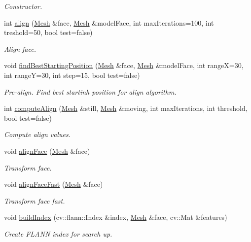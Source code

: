 \begin{DoxyCompactItemize}
\begin{DoxyCompactList}\small\item\em Constructor. \end{DoxyCompactList}\item 
int \hyperlink{class_face_aligner_af0bf1c512ec1c25be1600c175f29af3f}{align} (\hyperlink{class_mesh}{Mesh} \&face, \hyperlink{class_mesh}{Mesh} \&model\+Face, int max\+Iterations=100, int treshold=50, bool test=false)
\begin{DoxyCompactList}\small\item\em Align face. \end{DoxyCompactList}\item 
void \hyperlink{class_face_aligner_a784d5bcd6ab0ec3d231682ceeafd5797}{find\+Best\+Starting\+Position} (\hyperlink{class_mesh}{Mesh} \&face, \hyperlink{class_mesh}{Mesh} \&model\+Face, int range\+X=30, int range\+Y=30, int step=15, bool test=false)
\begin{DoxyCompactList}\small\item\em Pre-\/align. Find best startinh position for align algorithm. \end{DoxyCompactList}\item 
int \hyperlink{class_face_aligner_affaf430869c2c6ba9aadebe9dd24f285}{compute\+Align} (\hyperlink{class_mesh}{Mesh} \&still, \hyperlink{class_mesh}{Mesh} \&moving, int max\+Iterations, int threshold, bool test=false)
\begin{DoxyCompactList}\small\item\em Compute align values. \end{DoxyCompactList}\item 
void \hyperlink{class_face_aligner_ae0440700562df1c90665dc6f74d2d123}{align\+Face} (\hyperlink{class_mesh}{Mesh} \&face)
\begin{DoxyCompactList}\small\item\em Transform face. \end{DoxyCompactList}\item 
void \hyperlink{class_face_aligner_ac537bae8e86727951f2123cc29f338cc}{align\+Face\+Fast} (\hyperlink{class_mesh}{Mesh} \&face)
\begin{DoxyCompactList}\small\item\em Transform face fast. \end{DoxyCompactList}\item 
void \hyperlink{class_face_aligner_a8b1c57fddfaf47aefcdaf2f8400642e3}{build\+Index} (cv\+::flann\+::\+Index \&index, \hyperlink{class_mesh}{Mesh} \&face, cv\+::\+Mat \&features)
\begin{DoxyCompactList}\small\item\em Create F\+L\+A\+N\+N index for search up. \end{DoxyCompactList}\end{DoxyCompactItemize}
